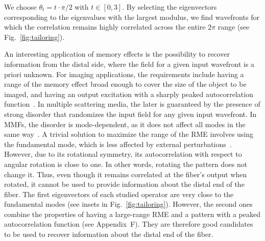 \documentclass[aps,prl,twocolumn, amsmath,amssymb,superscriptaddress]{revtex4-2}
\begin{document}
We choose $\theta_t = t\cdot\pi/2$ with $t\in[0, 3]$. 
By selecting the eigenvectors corresponding to the eigenvalues 
with the largest modulus, 
we find wavefronts for which the correlation remains highly correlated across the entire $2\pi$ range (see Fig.~\ref{fig:tailoring}).

An interesting application of memory effects is the possibility to recover information from the distal side, 
where the field for a given input wavefront is a priori unknown. 
For imaging applications, 
the requirements include having a range of the memory effect broad enough to cover the size of the object to be imaged, 
and having an output excitation with a sharply peaked autocorrelation function~\cite{bertolotti2012non-invasive}. 
In multiple scattering media, 
the later is guaranteed by the presence of strong disorder that randomizes the input field 
for any given input wavefront. 
In MMFs, the disorder is mode-dependent, as it does not affect all modes in the same way~\cite{Cizmar2011shaping}.
A trivial solution to maximize the range of the RME involves using the fundamental mode, 
which is less affected by external perturbations~\cite{matthes2021learning}.
However, due to its rotational symmetry, its autocorrelation with respect to angular rotation is close to one. 
In other words, rotating the pattern does not change it. 
Thus, even though it remains correlated at the fiber's output when rotated, 
it cannot be used to provide information about the distal end of the fiber. 
The first eigenvectors of each studied operator are very close to the fundamental modes (see insets in Fig.~\ref{fig:tailoring}). 
However, the second ones combine the properties of having a large-range RME  
and a pattern with a peaked autocorrelation function (see Appendix~F). 
They are therefore good candidates to be used to recover information about the distal end of the fiber.













\end{document}

